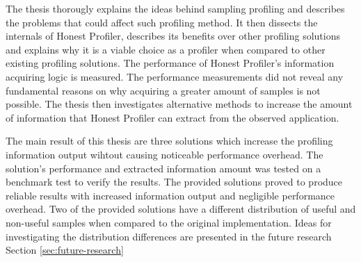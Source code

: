 \documentclass[..thesis.tex]{subfiles}
\begin{document}
The thesis thorougly explains the ideas behind sampling profiling and describes the problems that could affect such profiling method. It then dissects the internals of Honest Profiler, describes its benefits over other profiling solutions and explains why it is a viable choice as a profiler when compared to other existing profiling solutions. The performance of Honest Profiler's information acquiring logic is measured. The performance measurements did not reveal any fundamental reasons on why acquiring a greater amount of samples is not possible. The thesis then investigates alternative methods to increase the amount of information that  Honest Profiler can extract from the observed application.

The main result of this thesis are three solutions which increase the profiling information output wihtout causing noticeable performance overhead. The solution's performance and extracted information amount was tested on a benchmark test to verify the results. The provided solutions proved to produce reliable results with increased information output and negligible performance overhead. Two of the provided solutions have a different distribution of useful and non-useful samples when compared to the original implementation. Ideas for investigating the distribution differences are presented in the future research Section \ref{sec:future-research}
\end{document}
